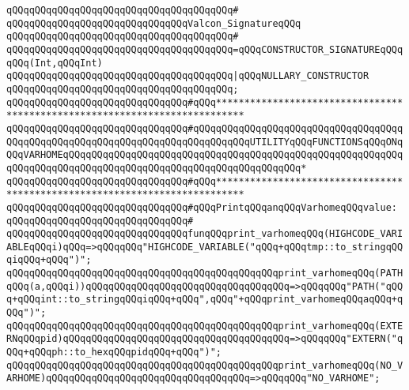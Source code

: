 \verb|qQQqqQQqqQQqqQQqqQQqqQQqqQQqqQQqqQQqqQQq#|\newline
\newline
\newline
\verb|qQQqqQQqqQQqqQQqqQQqqQQqqQQqqQQqValcon_SignatureqQQq|\newline
\verb|qQQqqQQqqQQqqQQqqQQqqQQqqQQqqQQqqQQqqQQq#|\newline
\verb|qQQqqQQqqQQqqQQqqQQqqQQqqQQqqQQqqQQqqQQq=qQQqCONSTRUCTOR_SIGNATUREqQQqqQQq(Int,qQQqInt)|\newline
\verb|qQQqqQQqqQQqqQQqqQQqqQQqqQQqqQQqqQQqqQQq|\verb#|qQQqNULLARY_CONSTRUCTOR#\newline
\verb|qQQqqQQqqQQqqQQqqQQqqQQqqQQqqQQqqQQqqQQq;|\newline
\newline
\verb|qQQqqQQqqQQqqQQqqQQqqQQqqQQqqQQq#qQQq***************************************************************************|\newline
\verb|qQQqqQQqqQQqqQQqqQQqqQQqqQQqqQQq#qQQqqQQqqQQqqQQqqQQqqQQqqQQqqQQqqQQqqQQqqQQqqQQqqQQqqQQqqQQqqQQqqQQqqQQqqQQqqQQqUTILITYqQQqFUNCTIONSqQQqONqQQqVARHOMEqQQqqQQqqQQqqQQqqQQqqQQqqQQqqQQqqQQqqQQqqQQqqQQqqQQqqQQqqQQqqQQqqQQqqQQqqQQqqQQqqQQqqQQqqQQqqQQqqQQqqQQqqQQqqQQq*|\newline
\verb|qQQqqQQqqQQqqQQqqQQqqQQqqQQqqQQq#qQQq***************************************************************************|\newline
\newline
\newline
\verb|qQQqqQQqqQQqqQQqqQQqqQQqqQQqqQQq#qQQqPrintqQQqanqQQqVarhomeqQQqvalue:|\newline
\verb|qQQqqQQqqQQqqQQqqQQqqQQqqQQqqQQq#|\newline
\verb|qQQqqQQqqQQqqQQqqQQqqQQqqQQqqQQqfunqQQqprint_varhomeqQQq(HIGHCODE_VARIABLEqQQqi)qQQq=>qQQqqQQq"HIGHCODE_VARIABLE("qQQq+qQQqtmp::to_stringqQQqiqQQq+qQQq")";|\newline
\verb|qQQqqQQqqQQqqQQqqQQqqQQqqQQqqQQqqQQqqQQqqQQqqQQqprint_varhomeqQQq(PATHqQQq(a,qQQqi))qQQqqQQqqQQqqQQqqQQqqQQqqQQqqQQqqQQq=>qQQqqQQq"PATH("qQQq+qQQqint::to_stringqQQqiqQQq+qQQq",qQQq"+qQQqprint_varhomeqQQqaqQQq+qQQq")";|\newline
\verb|qQQqqQQqqQQqqQQqqQQqqQQqqQQqqQQqqQQqqQQqqQQqqQQqprint_varhomeqQQq(EXTERNqQQqpid)qQQqqQQqqQQqqQQqqQQqqQQqqQQqqQQqqQQqqQQq=>qQQqqQQq"EXTERN("qQQq+qQQqph::to_hexqQQqpidqQQq+qQQq")";|\newline
\verb|qQQqqQQqqQQqqQQqqQQqqQQqqQQqqQQqqQQqqQQqqQQqqQQqprint_varhomeqQQq(NO_VARHOME)qQQqqQQqqQQqqQQqqQQqqQQqqQQqqQQqqQQq=>qQQqqQQq"NO_VARHOME";|\newline
